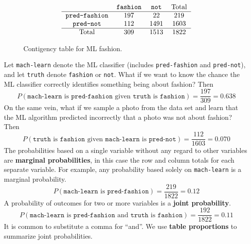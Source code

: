 \begin{figure}[H]
    \centering
\[
\begin{tabular}{cccc} 
    & \texttt{fashion}  &\texttt{not} & Total \\ \hline
    \texttt{pred-fashion}  & 197 & 22 & 219 \\
    \texttt{pred-not} & 112 & 1491 & 1603 \\ \hline 
    Total & 309 & 1513 & 1822 \\
\end{tabular}
\]     
\caption{Contigency table for ML fashion.} 
\end{figure}
Let \texttt{mach-learn} denote the ML classifier (includes \texttt{pred-fashion} and \texttt{pred-not}), and let \texttt{truth} denote \texttt{fashion} or \texttt{not}. What if we want to know the chance the ML classifier correctly identifies something being about fashion? Then \[
    P(\texttt{mach-learn} \text{ is } \texttt{pred-fashion} \text{ given } \texttt{truth} \text{ is } \texttt{fashion} ) = \frac{197}{309} =0.638
\] On the same vein, what if we sample a photo from the data set and learn that the ML algorithm predicted incorrectly that a photo was not about fashion? Then \[
    P(\texttt{truth} \text{ is } \texttt{fashion} \text{ given } \texttt{mach-learn} \text{ is } \texttt{pred-not} ) = \frac{112}{1603} =0.070
\] The probabilities based on a single variable without any regard to other variables are \textbf{marginal probabilities}, in this case the row and column totals for each separate variable. For example, any probability based solely on \texttt{mach-learn} is a marginal probability.\[
P(\texttt{mach-learn} \text{ is } \texttt{pred-fashion}) = \frac{219}{1822}=0.12
\] A probability of outcomes for two or more variables is a \textbf{joint probability}. \[
P(\texttt{mach-learn} \text{ is } \texttt{pred-fashion} \text{ and } \texttt{truth} \text{ is } \texttt{fashion}) = \frac{192}{1822}=0.11
\] It is common to substitute a comma for ``and''. We use \textbf{table proportions} to summarize joint probabilities.

